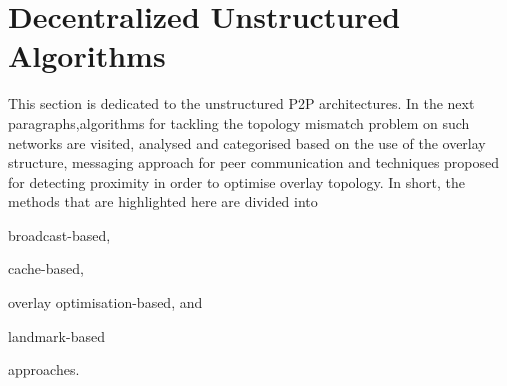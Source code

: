 \section{Decentralized Unstructured Algorithms}
\label{section:unstructured}

This section is dedicated to the unstructured P2P architectures. In the next
paragraphs,algorithms for tackling the topology mismatch problem on such
networks are visited, analysed and categorised based on the use of the overlay
structure, messaging approach for peer communication and techniques proposed for
detecting proximity in order to optimise overlay topology. In short, the methods
that are highlighted here are divided into
\begin{inparaenum}
  \item broadcast-based,
  \item cache-based,
  \item overlay optimisation-based, and
  \item landmark-based
\end{inparaenum}
 approaches.


%
%
%

